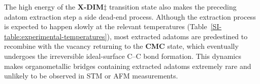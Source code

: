 \documentclass[aps,prb,amsmath,amssymb,11pt]{revtex4-1}
\newcommand{\zhzh}{\color{blue}}
\newcommand{\zhzh}{\color{blue}}
\begin{document}



The high energy of the \textbf{X-DIM$\ddagger$} transition state also makes the preceding adatom extraction step a side dead-end process. Although the extraction process is expected to happen slowly at the relevant temperatures (Table~\ref{SI-table:experimental-temperatures}), most extracted adatoms are predestined to recombine with the vacancy returning to the \textbf{CMC} state, which eventually undergoes the irreversible ideal-surface C--C bond formation. 
%
%
This dynamics makes organometallic bridges containing extracted adatoms extremely rare and unlikely to be observed in STM or AFM measurements.
\end{document}
